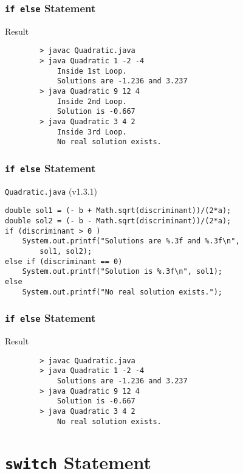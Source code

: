 \documentclass[10pt, compress]{beamer}
\begin{document}
\begin{frame}[fragile]
	\frametitle{\texttt{if else} Statement}
	\begin{block}{Result}
		\begin{verbatim}
		> javac Quadratic.java
		> java Quadratic 1 -2 -4
			Inside 1st Loop.
			Solutions are -1.236 and 3.237
		> java Quadratic 9 12 4
			Inside 2nd Loop.
			Solution is -0.667
		> java Quadratic 3 4 2
			Inside 3rd Loop.
			No real solution exists.
		\end{verbatim}
	\end{block}
\end{frame}

\begin{frame}[fragile]
	\frametitle{\texttt{if else} Statement}
	\begin{block}{\texttt{Quadratic.java} (v1.3.1)}
		\begin{verbatim}
double sol1 = (- b + Math.sqrt(discriminant))/(2*a);
double sol2 = (- b - Math.sqrt(discriminant))/(2*a);
if (discriminant > 0 )
	System.out.printf("Solutions are %.3f and %.3f\n",
		sol1, sol2);
else if (discriminant == 0)
	System.out.printf("Solution is %.3f\n", sol1);
else
	System.out.printf("No real solution exists.");
		\end{verbatim}
	\end{block}
\end{frame}

\begin{frame}[fragile]
	\frametitle{\texttt{if else} Statement}
	\begin{block}{Result}
		\begin{verbatim}
		> javac Quadratic.java
		> java Quadratic 1 -2 -4
			Solutions are -1.236 and 3.237
		> java Quadratic 9 12 4
			Solution is -0.667
		> java Quadratic 3 4 2
			No real solution exists.
		\end{verbatim}
	\end{block}
\end{frame}

\section{\texttt{switch} Statement}
\end{document}
